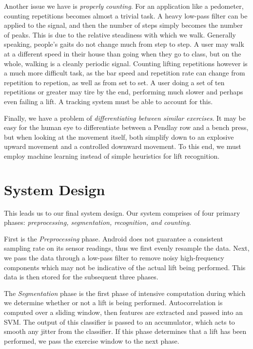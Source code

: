 Another issue we have is \textit{properly counting}. For an application like a pedometer, counting repetitions becomes almost a trivial task. A heavy low-pass filter can be applied to the signal, and then the number of steps simply becomes the number of peaks. This is due to the relative steadiness with which we walk. Generally speaking, people's gaits do not change much from step to step. A user may walk at a different speed in their house than going when they go to class, but on the whole, walking is a cleanly periodic signal. Counting lifting repetitions however is a much more difficult task, as the bar speed and repetition rate can change from repetition to repetion, as well as from set to set. A user doing a set of ten repetitions or greater may tire by the end, performing much slower and perhaps even failing a lift. A tracking system must be able to account for this. 

Finally, we have a problem of \textit{differentiating between similar exercises}. It may be easy for the human eye to differentiate between a Pendlay row and a bench press, but when looking at the movement itself, both simplify down to an explosive upward movement and a controlled downward movement. To this end, we must employ machine learning instead of simple heuristics for lift recognition. 

\section{System Design}

This leads us to our final system design. Our system comprises of four primary phases: \textit{preprocessing, segmentation, recognition, and counting}. 

First is the \textit{Preprocessing} phase. Android does not guarantee a consistent sampling rate on its sensor readings, thus we first evenly resample the data. Next, we pass the data through a low-pass filter to remove noisy high-frequency components which may not be indicative of the actual lift being performed. This data is then stored for the subsequent three phases.

The \textit{Segmentation} phase is the first phase of intensive computation during which we determine whether or not a lift is being performed. Autocorrelation is computed over a sliding window, then features are extracted and passed into an SVM. The output of this classifier is passed to an accumulator, which acts to smooth any jitter from the classifier. If this phase determines that a lift has been performed, we pass the exercise window to the next phase.

